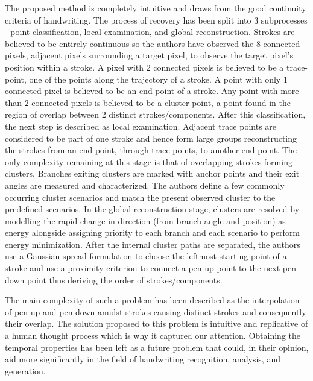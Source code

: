 \documentclass[10pt,twocolumn,letterpaper]{article}
\begin{document}
The proposed method is completely intuitive and draws from the good continuity criteria of handwriting. The process of recovery has been split into 3 subprocesses - point classification, local examination, and global reconstruction.
Strokes are believed to be entirely continuous so the authors have observed the 8-connected pixels, adjacent pixels surrounding a target pixel, to observe the target pixel's position within a stroke. A pixel with 2 connected pixels is believed to be a trace-point, one of the points along the trajectory of a stroke. A point with only 1 connected pixel is believed to be an end-point of a stroke. Any point with more than 2 connected pixels is believed to be a cluster point, a point found in the region of overlap between 2 distinct strokes/components.
After this classification, the next step is described as local examination. Adjacent trace points are considered to be part of one stroke and hence form large groups reconstructing the strokes from an end-point, through trace-points, to another end-point. The only complexity remaining at this stage is that of overlapping strokes forming clusters. Branches exiting clusters are marked with anchor points and their exit angles are measured and characterized. The authors define a few commonly occurring cluster scenarios and match the present observed cluster to the predefined scenarios.
In the global reconstruction stage, clusters are resolved by modelling the rapid change in direction (from branch angle and position) as energy alongside assigning priority to each branch and each scenario to perform energy minimization. After the internal cluster paths are separated, the authors use a Gaussian spread formulation to choose the leftmost starting point of a stroke and use a proximity criterion to connect a pen-up point to the next pen-down point thus deriving the order of strokes/components.

The main complexity of such a problem has been described as the interpolation of pen-up and pen-down amidst strokes causing distinct strokes and consequently their overlap. The solution proposed to this problem is intuitive and replicative of a human thought process which is why it captured our attention. Obtaining the temporal properties has been left as a future problem that could, in their opinion, aid more significantly in the field of handwriting recognition, analysis, and generation.
\end{document}
